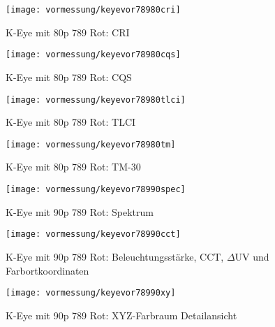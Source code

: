 \documentclass[pagesize,paper=A4,fontsize=12pt,utf8,numbers=noenddot,bibliography=totoc,listof=totoc,DIV=11,BCOR=1mm]{scrreprt}
\begin{document}
\begin{figure}[htp]     %
\centering
\texttt{[image: vormessung/keyevor78980cri]} 
\caption {K-Eye mit 80p 789 Rot: CRI} 
\end{figure}

\begin{figure}[htp]     %
\centering
\texttt{[image: vormessung/keyevor78980cqs]} 
\caption {K-Eye mit 80p 789 Rot: CQS} 
\end{figure}

\begin{figure}[htp]     %
\centering
\texttt{[image: vormessung/keyevor78980tlci]} 
\caption {K-Eye mit 80p 789 Rot: TLCI} 
\end{figure}

\begin{figure}[htp]     %
\centering
\texttt{[image: vormessung/keyevor78980tm]} 
\caption {K-Eye mit 80p 789 Rot: TM-30} 
\end{figure}




\begin{figure}[htp]     %
\centering
\texttt{[image: vormessung/keyevor78990spec]} 
\caption {K-Eye mit 90p 789 Rot: Spektrum} 
\end{figure}

\begin{figure}[htp]     %
\centering
\texttt{[image: vormessung/keyevor78990cct]} 
\caption {K-Eye mit 90p 789 Rot: Beleuchtungsstärke, CCT, $\Delta$UV und Farbortkoordinaten} 
\end{figure}

\begin{figure}[htp]     %
\centering
\texttt{[image: vormessung/keyevor78990xy]} 
\caption {K-Eye mit 90p 789 Rot: XYZ-Farbraum Detailansicht} 
\end{figure}
\end{document}
